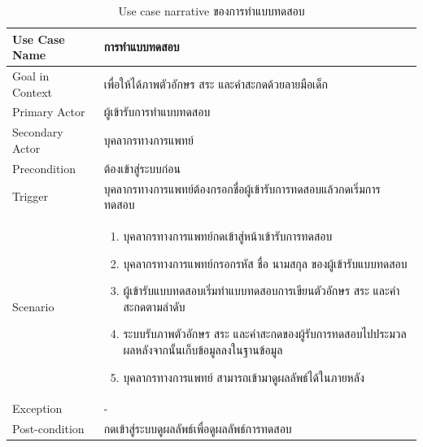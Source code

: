 \documentclass[12pt,oneside,openright,a4paper]{cpe-thai-project}
\begin{document}
\begin{itemize}
\begin{table}[!h]
      \caption{Use case narrative ของการทำแบบทดสอบ}\label{tbl:application1}
      \begin{tabular}{|p{4cm}|p{10cm}|} \hline
      Use Case Name & การทำแบบทดสอบ \\ \hline
      Goal in Context & เพื่อให้ได้ภาพตัวอักษร สระ และคำสะกดด้วยลายมือเด็ก \\ \hline
      Primary Actor & ผู้เข้ารับการทำแบบทดสอบ \\ \hline
      Secondary Actor & บุคลากรทางการแพทย์ \\ \hline
      Precondition & ต้องเข้าสู่ระบบก่อน \\ \hline
      Trigger & บุคลากรทางการแพทย์ต้องกรอกชื่อผู้เข้ารับการทดสอบแล้วกดเริ่มการทดสอบ \\ \hline
      Scenario & \begin{enumerate}
        \item บุคลากรทางการแพทย์กดเข้าสู่หน้าเข้ารับการทดสอบ
        \item บุคลากรทางการแพทย์กรอกรหัส ชื่อ นามสกุล ของผู้เข้ารับแบบทดสอบ
        \item ผู้เข้ารับแบบทดสอบเริ่มทำแบบทดสอบการเขียนตัวอักษร สระ และคำสะกดตามลำดับ
        \item ระบบรับภาพตัวอักษร สระ และคำสะกดของผู้รับการทดสอบไปประมวลผลหลังจากนั้นเก็บข้อมูลลงในฐานข้อมูล
        \item บุคลากรทางการแพทย์ สามารถเข้ามาดูผลลัพธ์ได้ในภายหลัง
      \end{enumerate} \\ \hline
      Exception & - \\ \hline
      Post-condition & กดเข้าสู่ระบบดูผลลัพธ์เพื่อดูผลลัพธ์การทดสอบ\\ \hline
      

\end{tabular}
\end{table}
\end{itemize}
\end{document}
